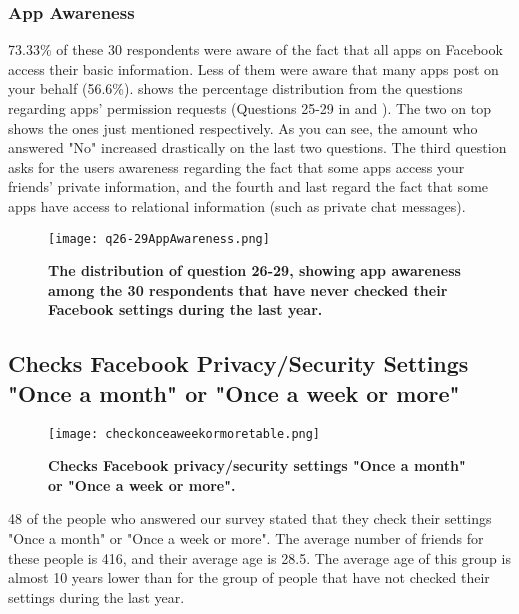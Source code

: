 \subsubsection{App Awareness}
73.33\% of these 30 respondents were aware of the fact that all apps on Facebook access their basic information. Less of them were aware that many apps post on your behalf (56.6\%).  shows the percentage distribution from the questions regarding apps' permission requests (Questions 25-29 in  and ). The two on top shows the ones just mentioned respectively. As you can see, the amount who answered "No" increased drastically on the last two questions. The third question asks for the users awareness regarding the fact that some apps access your friends' private information, and the fourth and last regard the fact that some apps have access to relational information (such as private chat messages). 

\begin{figure}[h!]
\centering
\texttt{[image: q26-29AppAwareness.png]}
\caption[The distribution of question 26-29, showing app awareness among the 30 respondents that have never checked their Facebook settings during the last year]{\textbf{The distribution of question 26-29, showing app awareness among the 30 respondents that have never checked their Facebook settings during the last year.}} 
\label{fig:appawarenessneverchecked}
\end{figure}

\subsection{Checks Facebook Privacy/Security Settings "Once a month" or "Once a week or more"}

\begin{figure}[h!]
\centering
\texttt{[image: checkonceaweekormoretable.png]}
\caption[Checks Facebook privacy/security settings "Once a month" or "Once a week or more"]{\textbf{Checks Facebook privacy/security settings "Once a month" or "Once a week or more".}} 
\label{fig:onceaweekormore}
\end{figure}

48 of the people who answered our survey stated that they check their settings "Once a month" or "Once a week or more". The average number of friends for these people is 416, and their average age is 28.5. The average age of this group is almost 10 years lower than for the group of people that have not checked their settings during the last year.

